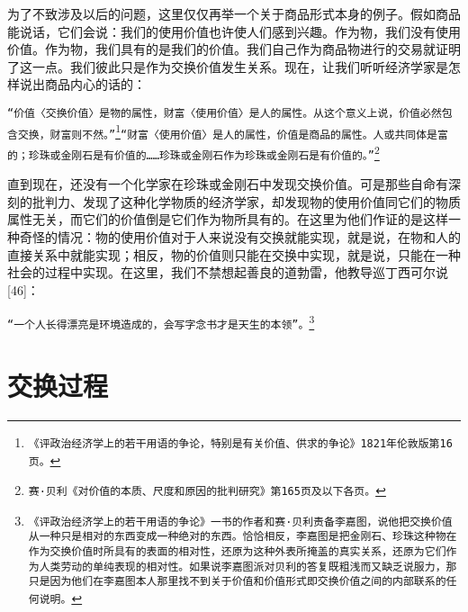 \documentclass{ctexbook}
\begin{document}
    为了不致涉及以后的问题，这里仅仅再举一个关于商品形式本身的例子。假如商品能说话，它们会说：我们的使用价值也许使人们感到兴趣。作为物，我们没有使用价值。作为物，我们具有的是我们的价值。我们自己作为商品物进行的交易就证明了这一点。我们彼此只是作为交换价值发生关系。现在，让我们听听经济学家是怎样说出商品内心的话的：
    
    \texttt{“价值〈交换价值〉是物的属性，财富〈使用价值〉是人的属性。从这个意义上说，价值必然包含交换，财富则不然。”\footnote{《评政治经济学上的若干用语的争论，特别是有关价值、供求的争论》1821年伦敦版第16页。}“财富〈使用价值〉是人的属性，价值是商品的属性。人或共同体是富的；珍珠或金刚石是有价值的……珍珠或金刚石作为珍珠或金刚石是有价值的。”\footnote{赛·贝利《对价值的本质、尺度和原因的批判研究》第165页及以下各页。}}
    
    直到现在，还没有一个化学家在珍珠或金刚石中发现交换价值。可是那些自命有深刻的批判力、发现了这种化学物质的经济学家，却发现物的使用价值同它们的物质属性无关，而它们的价值倒是它们作为物所具有的。在这里为他们作证的是这样一种奇怪的情况：物的使用价值对于人来说没有交换就能实现，就是说，在物和人的直接关系中就能实现；相反，物的价值则只能在交换中实现，就是说，只能在一种社会的过程中实现。在这里，我们不禁想起善良的道勃雷，他教导巡丁西可尔说[46]：
    
    \texttt{“一个人长得漂亮是环境造成的，会写字念书才是天生的本领”。\footnote{《评政治经济学上的若干用语的争论》一书的作者和赛·贝利责备李嘉图，说他把交换价值从一种只是相对的东西变成一种绝对的东西。恰恰相反，李嘉图是把金刚石、珍珠这种物在作为交换价值时所具有的表面的相对性，还原为这种外表所掩盖的真实关系，还原为它们作为人类劳动的单纯表现的相对性。如果说李嘉图派对贝利的答复既粗浅而又缺乏说服力，那只是因为他们在李嘉图本人那里找不到关于价值和价值形式即交换价值之间的内部联系的任何说明。}}

\chapter{交换过程}
\end{document}
